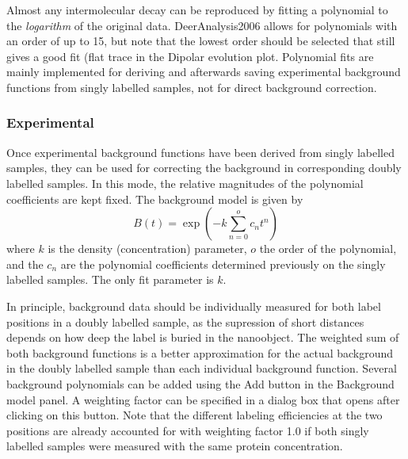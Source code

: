 \documentclass{article}
\begin{document}
Almost any intermolecular decay can be reproduced by fitting a polynomial to the \emph{logarithm} of the original data. DeerAnalysis2006 allows for polynomials with an order of up to 15, but note that the lowest order should be selected that still gives a good fit (flat trace in the {\ttfamily Dipolar evolution} plot. Polynomial fits are mainly implemented for deriving and afterwards saving experimental background functions from singly labelled samples, not for direct background correction.

\subsubsection{Experimental}
Once experimental background functions have been derived from singly labelled samples, they can be used for correcting the background in corresponding doubly labelled samples. In this mode, the relative magnitudes of the polynomial coefficients are kept fixed. The background model is given by
\begin{equation}
	B \left( t \right) = \exp \left( -k \sum _{n=0} ^o c_n t^n \right)
\end{equation}
where $k$ is the density (concentration) parameter, $o$ the order of the polynomial, and the $c_n$ are the polynomial coefficients determined previously on the singly labelled samples. The only fit parameter is $k$.

In principle, background data should be individually measured for both label positions in a doubly labelled sample, as the supression of short distances depends on how deep the label is buried in the nanoobject. The weighted sum of both background functions is a better approximation for the actual background in the doubly labelled sample than each individual background function. Several background polynomials can be added using the {\ttfamily Add} button in the {\ttfamily Background model} panel. A weighting factor can be specified in a dialog box that opens after clicking on this button. Note that the different labeling efficiencies at the two positions are already accounted for with weighting factor 1.0 if both singly labelled samples were measured with the same protein concentration. 
\end{document}
